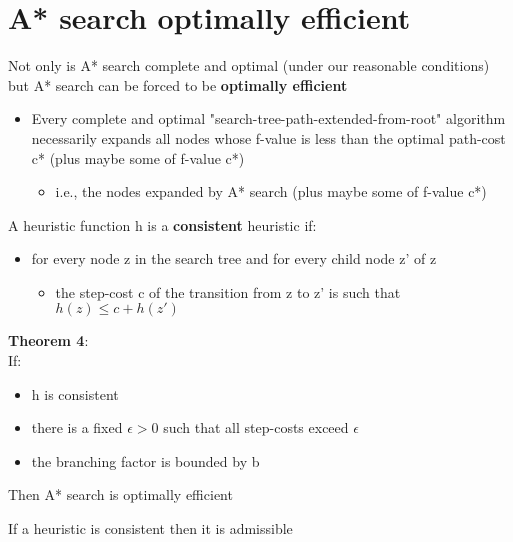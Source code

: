 \documentclass{article}[18pt]
\begin{document}
\section{A* search optimally efficient}
Not only is A* search complete and optimal (under our reasonable conditions) but A* search can be forced to be \textbf{optimally efficient}
\begin{itemize}
	\item Every complete and optimal "search-tree-path-extended-from-root" algorithm necessarily expands all nodes whose f-value is less than the optimal path-cost c* (plus maybe some of f-value c*)
	\begin{itemize}
		\item i.e., the nodes expanded by A* search (plus maybe some of f-value c*)
	\end{itemize}
\end{itemize}
A heuristic function h is a \textbf{consistent} heuristic if:
\begin{itemize}
	\item for every node z in the search tree and for every child node z' of z
	\begin{itemize}
		\item the step-cost c of the transition from z to z' is such that $h(z)\leqslant c+h(z')$
	\end{itemize}
\end{itemize}
\textbf{Theorem 4}:\\
If:
\begin{itemize}
	\item h is consistent
	\item there is a fixed $\epsilon >0$ such that all step-costs exceed $\epsilon$
	\item the branching factor is bounded by b
\end{itemize}
Then A* search is optimally efficient\\
\begin{important}
If a heuristic is consistent then it is admissible
\end{important}
\end{document}
